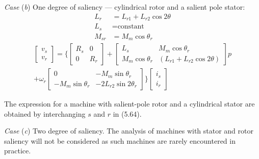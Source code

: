 \documentclass[a4paper,numbers=noenddot,12pt]{scrbook}
\begin{document}
    \noindent \textit{Case} (\textit{b}) One degree of saliency --- cylindrical rotor and a salient pole stator:	
    \begin{equation*}
        \begin{aligned}
            L_r & = L_{r1} + L_{r2} \cos 2\theta \\
            L_s & = \text{constant} \\
            M_{sr} & = M_m \cos \theta_r  
        \end{aligned}
    \end{equation*}
    \begin{multline}
        \begin{bmatrix}
            v_s \\ v_r
        \end{bmatrix} = \Bigg\{
            \begin{bmatrix}
                R_s & 0 \\ 0 & R_r 
            \end{bmatrix} +
            \begin{bmatrix}
                L_s & M_m \cos \theta_r \\
                M_m \cos \theta_r & (L_{r1} + L_{r2} \cos 2 \theta)
            \end{bmatrix}p \\
            + \omega_r
            \begin{bmatrix}
                0 & - M_m \sin \theta_r \\
                - M_m \sin \theta_r & -2 L_{r2} \sin 2 \theta_r
            \end{bmatrix}
        \Bigg\}
        \begin{bmatrix}
            i_s \\
            i_r
        \end{bmatrix}
    \end{multline}

    The expression for a machine with salient-pole rotor and a cylindrical stator are obtained by interchanging $s$ and $r$ in (5.64).

    \vspace{1em}

    \noindent \textit{Case} (\textit{c}) Two degree of saliency.  The analysis of machines with stator and rotor saliency will not be considered as such machines are rarely encountered in practice.
\end{document}
